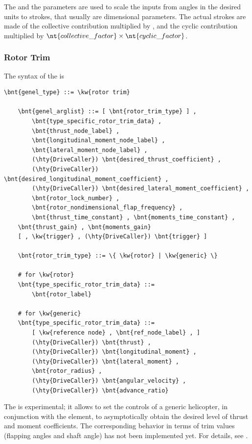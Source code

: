 The  and the  parameters are
used to scale the inputs from angles in the desired units to strokes, that
usually are dimensional parameters. The actual strokes are made of the
collective contribution multiplied by , and the
cyclic contribution multiplied by
$\nt{collective\_factor} \times \nt{cyclic\_factor}$.

\subsubsection{Rotor Trim}
\label{sec:EL:GENEL:ROTOR-TRIM}
The syntax of the  is
\begin{Verbatim}[commandchars=\\\{\}]
    \bnt{genel_type} ::= \kw{rotor trim}

    \bnt{genel_arglist} ::= [ \bnt{rotor_trim_type} ] ,
        \bnt{type_specific_rotor_trim_data} ,
        \bnt{thrust_node_label} ,
        \bnt{longitudinal_moment_node_label} ,
        \bnt{lateral_moment_node_label} ,
        (\hty{DriveCaller}) \bnt{desired_thrust_coefficient} ,
        (\hty{DriveCaller}) \bnt{desired_longitudinal_moment_coefficient} ,
        (\hty{DriveCaller}) \bnt{desired_lateral_moment_coefficient} ,
        \bnt{rotor_lock_number} ,
        \bnt{rotor_nondimensional_flap_frequency} ,
        \bnt{thrust_time_constant} , \bnt{moments_time_constant} ,
	\bnt{thrust_gain} , \bnt{moments_gain}
	[ , \kw{trigger} , (\hty{DriveCaller}) \bnt{trigger} ]

    \bnt{rotor_trim_type} ::= \{ \kw{rotor} | \kw{generic} \}

    # for \kw{rotor}
    \bnt{type_specific_rotor_trim_data} ::=
        \bnt{rotor_label}

    # for \kw{generic}
    \bnt{type_specific_rotor_trim_data} ::=
        [ \kw{reference node} , \bnt{ref_node_label} , ]
        (\hty{DriveCaller}) \bnt{thrust} ,
        (\hty{DriveCaller}) \bnt{longitudinal_moment} ,
        (\hty{DriveCaller}) \bnt{lateral_moment} ,
        \bnt{rotor_radius} ,
        (\hty{DriveCaller}) \bnt{angular_velocity} ,
        (\hty{DriveCaller}) \bnt{advance_ratio}
\end{Verbatim}
The  is experimental; it allows to set the controls 
of a generic helicopter, in conjunction with the 
element, to asymptotically obtain the desired level of thrust and
moment coefficients.
The corresponding behavior in terms of trim values (flapping angles
and shaft angle) has not been implemented yet.
For details, see \cite{PETERS-TRIM90}.







